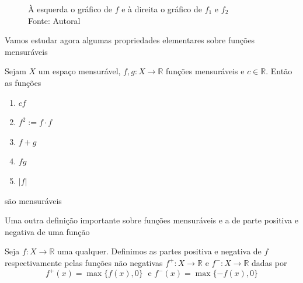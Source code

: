 \documentclass[a4paper, 11pt]{book}
\theoremstyle{definition}
\newcommand{\bR}{\mathbb{R}}
\begin{document}
\begin{ex}
\begin{figure}
        \caption{À esquerda o gráfico de $f$ e à direita o gráfico de $f_1$ e $f_2$\\Fonte: Autoral}
        \label{fig:truncagem}
    \end{figure}
\end{ex}

Vamos estudar agora algumas propriedades elementares sobre funções mensuráveis

\begin{pbox}
    Sejam $X$ um espaço mensurável, $f, g : X \to \bR$ funções mensuráveis e $c \in \bR$. Então as funções
    \begin{enumerate}[leftmargin=*, label=\textbf{(\alph*)}]
        \item $cf$
        \item $f^2 := f \cdot f$
        \item $f + g$
        \item $fg$
        \item $|f|$
    \end{enumerate}
    são mensuráveis
\end{pbox}
\begin{prf}
    
\end{prf}

Uma outra definição importante sobre funções mensuráveis e a de parte positiva e negativa de uma função
\begin{dbox}
    Seja $f : X \to \bR$ uma qualquer.
    Definimos as partes positiva e negativa de $f$ respectivamente pelas funções não negativas $f^+ : X \to \bR$ e $f^- : X \to \bR$ dadas por
    \[
        f^+(x) = \max\{f(x), 0\} \;\text{ e } f^-(x) = \max\{-f(x), 0\}
    \]
\end{dbox}
\end{document}
